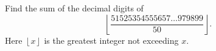 Find the sum of the decimal digits of \[ \left\lfloor \frac{51525354555657\dots979899}{50} \right\rfloor. \] Here $\left\lfloor x \right\rfloor$ is the greatest integer not exceeding $x$.
